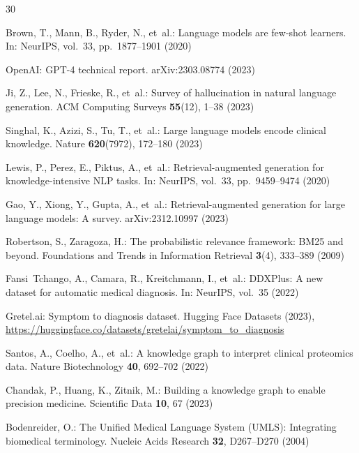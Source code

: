\documentclass[runningheads]{llncs}
\begin{document}


\begin{thebibliography}{30}

Brown, T., Mann, B., Ryder, N., et~al.: Language models are few-shot learners. In: NeurIPS, vol.~33, pp.~1877--1901 (2020)

OpenAI: GPT-4 technical report. arXiv:2303.08774 (2023)

Ji, Z., Lee, N., Frieske, R., et~al.: Survey of hallucination in natural language generation. ACM Computing Surveys \textbf{55}(12), 1--38 (2023)

Singhal, K., Azizi, S., Tu, T., et~al.: Large language models encode clinical knowledge. Nature \textbf{620}(7972), 172--180 (2023)

Lewis, P., Perez, E., Piktus, A., et~al.: Retrieval-augmented generation for knowledge-intensive NLP tasks. In: NeurIPS, vol.~33, pp.~9459--9474 (2020)

Gao, Y., Xiong, Y., Gupta, A., et~al.: Retrieval-augmented generation for large language models: A survey. arXiv:2312.10997 (2023)

Robertson, S., Zaragoza, H.: The probabilistic relevance framework: BM25 and beyond. Foundations and Trends in Information Retrieval \textbf{3}(4), 333--389 (2009)

Fansi~Tchango, A., Camara, R., Kreitchmann, I., et~al.: DDXPlus: A new dataset for automatic medical diagnosis. In: NeurIPS, vol.~35 (2022)

Gretel.ai: Symptom to diagnosis dataset. Hugging Face Datasets (2023), \url{https://huggingface.co/datasets/gretelai/symptom_to_diagnosis}

Santos, A., Coelho, A., et~al.: A knowledge graph to interpret clinical proteomics data. Nature Biotechnology \textbf{40}, 692--702 (2022)

Chandak, P., Huang, K., Zitnik, M.: Building a knowledge graph to enable precision medicine. Scientific Data \textbf{10}, 67 (2023)

Bodenreider, O.: The Unified Medical Language System (UMLS): Integrating biomedical terminology. Nucleic Acids Research \textbf{32}, D267--D270 (2004)


\end{thebibliography}
\end{document}
